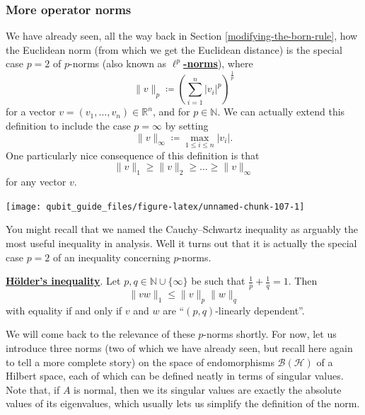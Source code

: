 \documentclass[fleqn,a4paper]{article}
\renewcommand{\footnote}[1]{\sidenotetext[{\color{white}0}\!\!]{\footnotesize #1}}
\newenvironment{idea}{\everypar{\setlength{\parindent}{1.5em}}}{}
\theoremstyle{definition}
\theoremstyle{definition}
\theoremstyle{definition}
\theoremstyle{definition}
\theoremstyle{remark}
\begin{document}
\hypertarget{more-operator-norms}{%
\subsubsection{More operator norms}\label{more-operator-norms}}

We have already seen, all the way back in Section \ref{modifying-the-born-rule}\footnote{Think how far you've come since then!}, how the Euclidean norm (from which we get the Euclidean distance) is the special case \(p=2\) of \(p\)-norms (also known as \href{https://en.wikipedia.org/wiki/Lp_space}{\textbf{\(\ell^p\)-norms}}), where
\[
  \|v\|_p \coloneqq \left( \sum_{i=1}^n |v_i|^p \right)^{\frac{1}{p}}
\]
for a vector \(v=(v_1,\ldots,v_n)\in\mathbb{R}^n\), and for \(p\in\mathbb{N}\).
We can actually extend this definition to include the case \(p=\infty\) by setting
\[
  \|v\|_\infty \coloneqq \max_{1\leqslant i\leqslant n}|v_i|.
\]
One particularly nice consequence of this definition is that
\[
  \|v\|_1 \geqslant\|v\|_2 \geqslant\ldots \geqslant\|v\|_\infty
\]
for any vector \(v\).

\begin{center}\texttt{[image: qubit\_guide\_files/figure-latex/unnamed-chunk-107-1]} \end{center}

You might recall that we named the Cauchy--Schwartz inequality as arguably the most useful inequality in analysis.
Well it turns out that it is actually the special case \(p=2\) of an inequality concerning \(p\)-norms.

\begin{idea}
\href{https://en.wikipedia.org/wiki/H\%25C3\%25B6lder\%27s_inequality}{\textbf{Hölder's inequality}}.
Let \(p,q\in\mathbb{N}\cup\{\infty\}\) be such that \(\frac{1}{p}+\frac{1}{q}=1\).
Then
\[
  \|vw\|_1 \leqslant\|v\|_p\|w\|_q
\]
with equality if and only if \(v\) and \(w\) are ``\((p,q)\)-linearly dependent''.

\end{idea}

We will come back to the relevance of these \(p\)-norms shortly.
For now, let us introduce three norms (two of which we have already seen, but recall here again to tell a more complete story) on the space of endomorphisms \(\mathcal{B}(\mathcal{H})\) of a Hilbert space, each of which can be defined neatly in terms of singular values.
Note that, if \(A\) is normal, then we its singular values are exactly the absolute values of its eigenvalues, which usually lets us simplify the definition of the norm.
\end{document}
